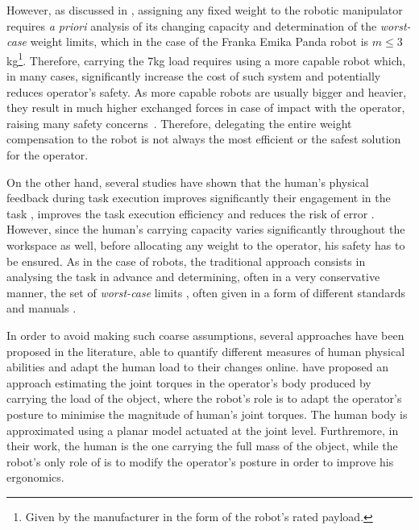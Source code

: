 However, as discussed in , assigning any fixed weight to the robotic manipulator requires \textit{a priori} analysis of its changing capacity and determination of the \textit{worst-case} weight limits, which in the case of the Franka Emika Panda robot is $m\leq3$kg\footnote{Given by the manufacturer in the form of the robot's rated payload.}. Therefore, carrying the 7kg load requires using a more capable robot which, in many cases, significantly increase the cost of such system and potentially reduces operator's safety. As more capable robots are usually bigger and heavier, they result in much higher exchanged forces in case of impact with the operator, raising many safety concerns~\cite{smu}.
Therefore, delegating the entire weight compensation to the robot is not always the most efficient or the safest solution for the operator. 

On the other hand, several studies have shown that the human's physical feedback during task execution improves significantly their engagement in the task \cite{rani2007operator}, improves the task execution efficiency and reduces the risk of error \cite{BYRNE1996249}. However, since the human's carrying capacity varies significantly throughout the workspace as well, before allocating any weight to the operator, his safety has to be ensured. As in the case of robots, the traditional approach consists in analysing the task in advance and determining, often in a very conservative manner, the set of \textit{worst-case} limits \cite{shoaf1997comprehensive}, often given in a form of different standards \cite{nasa} and manuals \cite{health1992manual}. 

In order to avoid making such coarse assumptions, several approaches have been proposed in the literature, able to quantify different measures of human physical abilities and adapt the human load to their changes online. \citet{Kim2018} have proposed an approach estimating the joint torques in the operator's body produced by carrying the load of the object, where the robot's role is to adapt the operator's posture to minimise the magnitude of human's joint torques. The human body is approximated using a planar model actuated at the joint level. Furthremore, in their work, the human is the one carrying the full mass of the object, while the robot's only role of is to modify the operator's posture in order to improve his ergonomics. 

